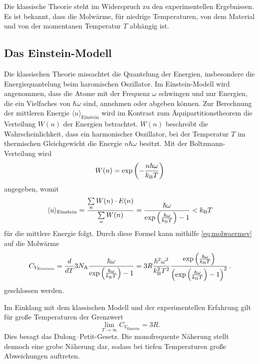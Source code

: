 Die klassische Theorie steht im Widerspruch zu den experimentellen Ergebnissen.
Es ist bekannt, 
dass die Molwärme, für niedrige Temperaturen, 
von dem Material und von der momentanen Temperatur $T$ abhängig ist.


\subsection{Das Einstein-Modell}
Die klassischen Theorie missachtet die Quantelung der Energien, insbesondere die Energiequantelung beim haromischen Oszillator. 
Im Einstein-Modell wird angenommen, 
dass die Atome mit der Frequenz $\omega$ schwingen und  nur Energien, die ein Vielfaches von $\hbar\omega$ sind, annehmen oder abgeben können.
Zur Berechnung der mittleren Energie $\langle u \rangle _\text{Einstein}$ wird im Kontrast zum Äquipartitionstheorem die Verteilung $W(n)$ der Energien betrachtet. 
$W(n)$ beschreibt die Wahrscheinlichkeit, 
dass ein harmonischer Oszillator, 
bei der Temperatur $T$ im thermischen Gleichgewicht die Energie $n\hbar\omega$ besitzt.
Mit der Boltzmann-Verteilung wird
\begin{equation*}
	W(n) = \exp{\left(-\frac{n\hbar \omega}{k_\text B T}\right)}
\end{equation*}
angegeben, womit 
\begin{equation*}
	\langle u \rangle _\text{Einstein} = \frac{\sum\limits_n W(n)\cdot E(n)}{\sum\limits_n W(n)}=	\frac{\hbar\omega}{\exp{\left(\frac{\hbar\omega}{k_\text B T}\right)} - 1}  < k_\text B T
\end{equation*}
für die mittlere Energie folgt.
Durch diese Formel kann mithilfe \eqref{eq:molwaermev} auf die Molwärme
\begin{equation}
	C_{V_\text{Einstein}} = \frac{d}{dT}3 N_\text A \frac{\hbar\omega}{\exp{\left(\frac{\hbar\omega}{k_\text B T}\right)} - 1} = 3R \frac{\hbar^2\omega^2}{k_\text B ^2 T^2} \frac{\exp{\left(\frac{\hbar\omega}{k_\text B T}\right)}}{\left(\exp{\left(\frac{\hbar\omega}{k_\text B T}\right)}-1\right)^2}\,\text.
	\label{eqn:cv}
\end{equation}
geschlossen werden.

Im Einklang mit dem klassischen Modell und der experimentellen Erfahrung gilt für große Temperaturen der Grenzwert
\begin{equation}
	\lim_{T\to\infty} C_{V_\text{Einstein}} = 3R.
\end{equation}
Dies besagt das Dulong--Petit-Gesetz.
Die monofrequente Näherung stellt dennoch eine grobe Näherung dar, 
sodass bei tiefen Temperaturen große Abweichungen auftreten.

